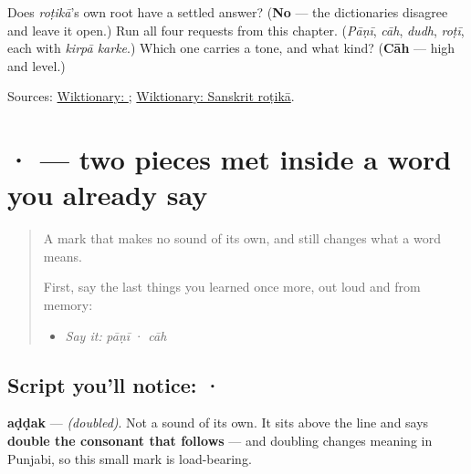 \begin{tcolorbox}[breakable,colback=teal!4,colframe=teal!35!black,title={Before you move on}]
Does \emph{roṭikā}'s own root have a settled answer? (\textbf{No} — the dictionaries disagree and leave it open.) Run all four requests from this chapter. (\emph{Pāṇī}, \emph{cāh}, \emph{dudh}, \emph{roṭī}, each with \emph{kirpā karke}.) Which one carries a tone, and what kind? (\textbf{Cāh} — high and level.)

Sources: \href{https://en.wiktionary.org/wiki/\%E0\%A8\%B0\%E0\%A9\%8B\%E0\%A8\%9F\%E0\%A9\%80}{Wiktionary: }; \href{https://en.wiktionary.org/wiki/\%E0\%A4\%B0\%E0\%A5\%8B\%E0\%A4\%9F\%E0\%A4\%BF\%E0\%A4\%95\%E0\%A4\%BE}{Wiktionary: Sanskrit roṭikā}.
\end{tcolorbox}
\section[\texorpdfstring{\pa{ੱ} · \pa{ਧ} ((doubled) · dha)}{ੱ · ਧ ((doubled) · dha)}]{ ·  — two pieces met inside a word you already say}

\label{lesson:PA-S10-addak-dhadda}



\begin{quote}
A mark that makes no sound of its own, and still changes what a word means.

First, say the last things you learned once more, out loud and from memory:

\begin{itemize}
\raggedright
  \item \emph{Say it:} \emph{pāṇī} · \emph{cāh}
\end{itemize}
\end{quote}

\subsection*{Script you'll notice:  · }
\begin{quote}
\end{quote}

\textbf{aḍḍak} — \emph{(doubled)}. Not a sound of its own. It sits above the line and says \textbf{double the consonant that follows} — and doubling changes meaning in Punjabi, so this small mark is load-bearing.

\begin{quote}
\end{quote}

